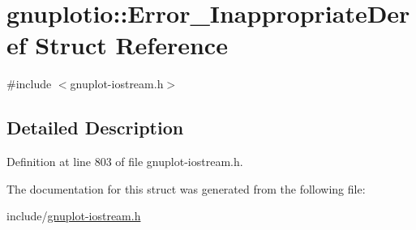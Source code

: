 \hypertarget{structgnuplotio_1_1_error___inappropriate_deref}{}\section{gnuplotio\+:\+:Error\+\_\+\+Inappropriate\+Deref Struct Reference}
\label{structgnuplotio_1_1_error___inappropriate_deref}


{\ttfamily \#include $<$gnuplot-\/iostream.\+h$>$}



\subsection{Detailed Description}


Definition at line 803 of file gnuplot-\/iostream.\+h.



The documentation for this struct was generated from the following file\+:\begin{DoxyCompactItemize}
\item 
include/\hyperlink{gnuplot-iostream_8h}{gnuplot-\/iostream.\+h}\end{DoxyCompactItemize}
